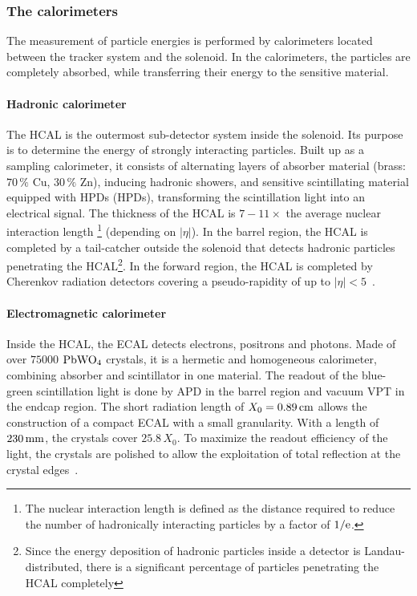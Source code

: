\subsubsection{The calorimeters}
The measurement of particle energies is performed by calorimeters located between the tracker system and the solenoid. In the calorimeters, the particles are completely absorbed, while transferring their energy to the sensitive material.

\paragraph*{Hadronic calorimeter} The \ac{HCAL} is the outermost sub-detector system inside the solenoid. Its purpose is to determine the energy of strongly interacting particles. Built up as a sampling calorimeter, it consists of alternating layers of absorber material (brass: $70\,\%$ Cu, $30\,\%$ Zn), inducing hadronic showers, and sensitive scintillating material equipped with \acl{HPD}s (\acs{HPD}s), transforming the scintillation light into an electrical signal. The thickness of the \ac{HCAL} is $7-11\times$ the average nuclear interaction length \footnote{The nuclear interaction length is defined as the distance required to reduce the number of hadronically interacting particles by a factor of $1/\rm{e}$.} (depending on $|\eta|$). In the barrel region, the \ac{HCAL} is completed by a tail-catcher outside the solenoid that detects hadronic particles penetrating the \ac{HCAL}\footnote{Since the energy deposition of hadronic particles inside a detector is Landau-distributed, there is a significant percentage of particles penetrating the \ac{HCAL} completely}. In the forward region, the \ac{HCAL} is completed by Cherenkov radiation detectors covering a pseudo-rapidity of up to $|\eta|<5$~\cite{C+08}.

\paragraph*{Electromagnetic calorimeter} Inside the \ac{HCAL}, the \ac{ECAL} detects electrons, positrons and photons. Made of over $75000$ $\rm{PbWO_4}$ crystals, it is a hermetic and homogeneous calorimeter, combining absorber and scintillator in one material. The readout of the blue-green scintillation light is done by \ac{APD} in the barrel region and vacuum \ac{VPT} in the endcap region. The short radiation length of $X_0=0.89\,\rm{cm}$ allows the construction of a compact \ac{ECAL} with a small granularity. With a length of $230\,\rm{mm}$, the crystals cover $25.8\,X_0$. To maximize the readout efficiency of the light, the crystals are polished to allow the exploitation of total reflection at the crystal edges~\cite{C+08}.

